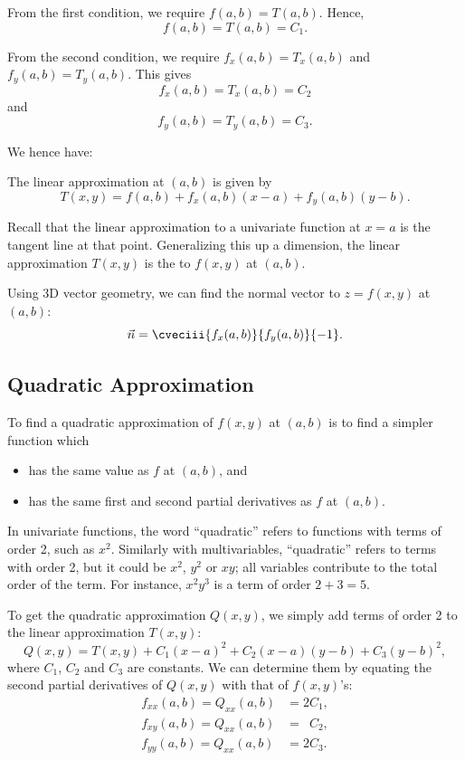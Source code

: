 From the first condition, we require $f(a, b) = T(a, b)$. Hence, \[f(a, b) = T(a, b) = C_1.\]

From the second condition, we require $f_x(a, b) = T_x(a, b)$ and $f_y(a, b) = T_y(a, b)$. This gives \[f_x(a,b) = T_x(a,b) = C_2\] and \[f_y(a, b) = T_y(a,b) = C_3.\]

We hence have:
\begin{proposition}
    The linear approximation at $(a, b)$ is given by \[T(x, y) = f(a, b) + f_x(a,b) (x-a) + f_y(a, b) (y-b).\]
\end{proposition}

Recall that the linear approximation to a univariate function at $x = a$ is the tangent line at that point. Generalizing this up a dimension, the linear approximation $T(x, y)$ is the  to $f(x, y)$ at $(a, b)$.

Using 3D vector geometry, we can find the normal vector to $z = f(x, y)$ at $(a, b)$: \[\vec n = \cveciii{f_x(a,b)}{f_y(a,b)}{-1}.\]

\subsection{Quadratic Approximation}

To find a quadratic approximation of $f(x, y)$ at $(a, b)$ is to find a simpler function which
\begin{itemize}
    \item has the same value as $f$ at $(a, b)$, and
    \item has the same first and second partial derivatives as $f$ at $(a, b)$.
\end{itemize}

\begin{remark}
    In univariate functions, the word ``quadratic'' refers to functions with terms of order 2, such as $x^2$. Similarly with multivariables, ``quadratic'' refers to terms with order 2, but it could be $x^2$, $y^2$ or $xy$; all variables contribute to the total order of the term. For instance, $x^2 y^3$ is a term of order $2 + 3 = 5$.
\end{remark}

To get the quadratic approximation $Q(x, y)$, we simply add terms of order 2 to the linear approximation $T(x, y)$: \[Q(x, y) =  T(x,y) + C_1 (x-a)^2 + C_2 (x-a)(y-b) + C_3 (y-b)^2,\] where $C_1$, $C_2$ and $C_3$ are constants. We can determine them by equating the second partial derivatives of $Q(x, y)$ with that of $f(x, y)$'s:
\begin{align*}
    f_{xx}(a, b) = Q_{xx}(a, b) &= 2C_1,\\
    f_{xy}(a, b) = Q_{xx}(a, b) &= \phantom{2}C_2,\\
    f_{yy}(a, b) = Q_{xx}(a, b) &= 2C_3.
\end{align*}

